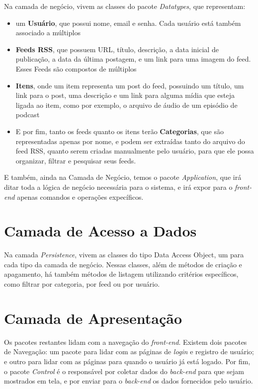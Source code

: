 Na camada de negócio, vivem as classes do pacote \textit{Datatypes}, que representam:
\begin{itemize}
	\item um \textbf{Usuário}, que possui nome, email e senha. Cada usuário está também associado a múltiplos
	\item \textbf{Feeds RSS}, que possuem URL, título, descrição, a data inicial de publicação, a data da última postagem, e um link para uma imagem do feed. Esses Feeds são compostos de múltiplos
	\item \textbf{Itens}, onde um item representa um post do feed, possuindo um título, um link para o post, uma descrição e um link para alguma mídia que esteja ligada ao item, como por exemplo, o arquivo de áudio de um episódio de podcast
	\item E por fim, tanto os feeds quanto os itens terão \textbf{Categorias}, que são representadas apenas por nome, e podem ser extraídas tanto do arquivo do feed RSS, quanto serem criadas manualmente pelo usuário, para que ele possa organizar, filtrar e pesquisar seus feeds.
\end{itemize}

E também, ainda na Camada de Negócio, temos o pacote \textit{Application}, que irá ditar toda a lógica de negócio necessária para o sistema, e irá expor para o \textit{front-end} apenas comandos e operações expecíficos.

\section{Camada de Acesso a Dados}
\label{sec-frameweb-dados}

Na camada \textit{Persistence}, vivem as classes do tipo Data Access Object, um para cada tipo da camada de negócio. Nessas classes, além de métodos de criação e apagamento, há também métodos de listagem utilizando critérios específicos, como filtrar por categoria, por feed ou por usuário.

\section{Camada de Apresentação}
\label{sec-frameweb-apresentacao}

Os pacotes restantes lidam com a navegação do \textit{front-end}. Existem dois pacotes de Navegação: um pacote para lidar com as páginas de \textit{login} e registro de usuário; e outro para lidar com as páginas para quando o usuário já está logado. Por fim, o pacote \textit{Control} é o responsável por coletar dados do \textit{back-end} para que sejam mostrados em tela, e por enviar para o \textit{back-end} os dados fornecidos pelo usuário.